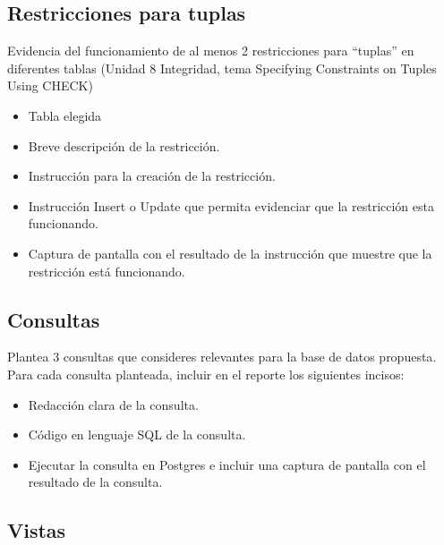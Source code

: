 \subsection{Restricciones para tuplas}

Evidencia del funcionamiento de al menos 2 restricciones para “tuplas” en diferentes tablas (Unidad 8 Integridad, tema Specifying Constraints on Tuples Using CHECK)
\begin{itemize}
    \item Tabla elegida
    \item Breve descripción de la restricción.
    \item Instrucción para la creación de la restricción.
    \item Instrucción Insert o Update que permita evidenciar que la restricción esta funcionando.
    \item Captura de pantalla con el resultado de la instrucción que muestre que la restricción está
    funcionando.
\end{itemize}



\subsection{Consultas}

Plantea 3 consultas que consideres relevantes para la base de datos propuesta. Para cada consulta planteada, incluir en el reporte los siguientes incisos:
\begin{itemize}
    \item Redacción clara de la consulta.
    \item Código en lenguaje SQL de la consulta.
    \item Ejecutar la consulta en Postgres e incluir una captura de pantalla con el resultado de la
    consulta.
\end{itemize}

\subsection{Vistas}

